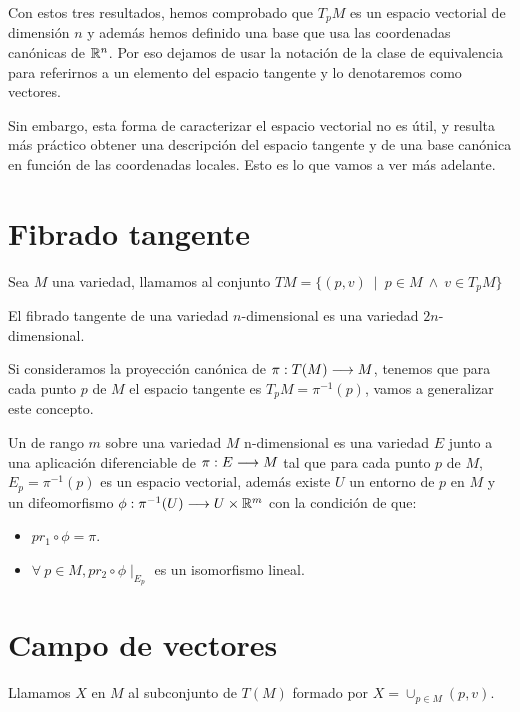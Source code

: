 Con estos tres resultados, hemos comprobado que $T_pM$ es un espacio vectorial de dimensión $n$
y además hemos definido una base que usa las coordenadas canónicas de $\mathbb{R}^n$.
Por eso dejamos de usar la notación de la clase de equivalencia para referirnos a un elemento del
espacio tangente y lo denotaremos como vectores.

Sin embargo, esta forma de caracterizar el espacio vectorial no es útil, y resulta más práctico
obtener una descripción del espacio tangente y de una base canónica en función de las coordenadas
locales.
Esto es lo que vamos a ver más adelante.


\section{Fibrado tangente}\label{sec:fibrado-tangente}
\begin{definition}
  Sea $M$ una variedad, llamamos  al
  conjunto $TM=\{(p,v)\ \mid\ p\in M\ \land\ v\in T_pM\}$
\end{definition}

\begin{proposition}
  El fibrado tangente de una variedad $n$-dimensional es una variedad $2n$-dimensional.
\end{proposition}

Si consideramos la proyección canónica de $\pi:T(M)\longrightarrow M$, tenemos que para cada punto $p$ de
$M$ el espacio tangente es $T_pM=\pi^{-1}(p)$, vamos a generalizar este concepto.

\begin{definition}
  Un  de rango $m$ sobre una variedad $M$
  n-dimensional es una variedad $E$ junto a una aplicación diferenciable de $\pi:E\longrightarrow M$ tal
  que para cada punto $p$ de $M$, $E_p=\pi^{-1}(p)$ es un espacio vectorial, además existe $U$ un
  entorno de $p$ en $M$ y un difeomorfismo $\phi:\pi^{-1}(U)\longrightarrow U\times\mathbb{R}^m$ con la condición
  de que:
  \begin{itemize}
    \item $pr_1\circ\phi=\pi$.
    \item $\forall\ p\in M, pr_2\circ\phi\mid_E_p$ es un isomorfismo lineal.
  \end{itemize}
\end{definition}


\section{Campo de vectores}\label{sec:campo-de-vectores}
\begin{definition}
  Llamamos \label{def:campo-vectores} $X$ en $M$ al subconjunto de $T(M)$ formado por
  $X=\cup_{p\in M}(p,
  v)$.
\end{definition}

